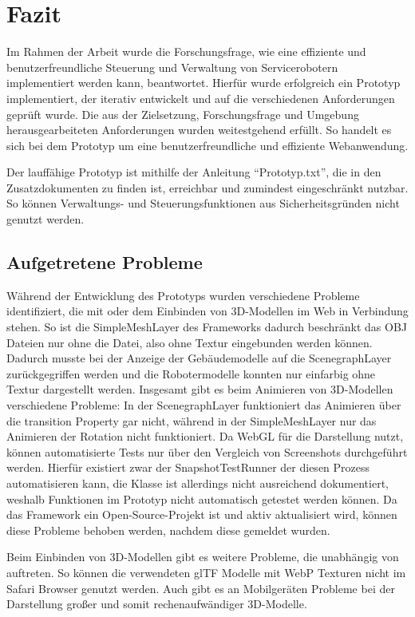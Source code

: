 \newpage
\section{Fazit}
Im Rahmen der Arbeit wurde die Forschungsfrage, wie eine effiziente und benutzerfreundliche Steuerung und Verwaltung von Servicerobotern implementiert werden kann, beantwortet. Hierfür wurde erfolgreich ein Prototyp implementiert, der iterativ entwickelt und auf die verschiedenen Anforderungen geprüft wurde. Die aus der Zielsetzung, Forschungsfrage und Umgebung herausgearbeiteten Anforderungen wurden weitestgehend erfüllt. So handelt es sich bei dem Prototyp um eine benutzerfreundliche und effiziente Webanwendung.

Der lauffähige Prototyp ist mithilfe der Anleitung ``Prototyp.txt'', die in den Zusatzdokumenten zu finden ist, erreichbar und zumindest eingeschränkt nutzbar. So können Verwaltungs- und Steuerungsfunktionen aus Sicherheitsgründen nicht genutzt werden.

\subsection{Aufgetretene Probleme}
Während der Entwicklung des Prototyps wurden verschiedene Probleme identifiziert, die mit \deckgl{} oder dem Einbinden von 3D-Modellen im Web in Verbindung stehen. So ist die SimpleMeshLayer des Frameworks dadurch beschränkt das \ac{OBJ} Dateien nur ohne die \mtl{} Datei, also ohne Textur eingebunden werden können. Dadurch musste bei der Anzeige der Gebäudemodelle auf die ScenegraphLayer zurückgegriffen werden und die Robotermodelle konnten nur einfarbig ohne Textur dargestellt werden. Insgesamt gibt es beim Animieren von 3D-Modellen verschiedene Probleme: In der ScenegraphLayer funktioniert das Animieren über die transition Property gar nicht, während in der SimpleMeshLayer nur das Animieren der Rotation nicht funktioniert. Da \deckgl{} \ac{WebGL} für die Darstellung nutzt, können automatisierte Tests nur über den Vergleich von Screenshots durchgeführt werden. Hierfür existiert zwar der SnapshotTestRunner der diesen Prozess automatisieren kann, die Klasse ist allerdings nicht ausreichend dokumentiert, weshalb \deckgl{} Funktionen im Prototyp nicht automatisch getestet werden können. Da das Framework ein Open-Source-Projekt ist und aktiv aktualisiert wird, können diese Probleme behoben werden, nachdem diese gemeldet wurden.

Beim Einbinden von 3D-Modellen gibt es weitere Probleme, die unabhängig von \deckgl{} auftreten. So können die verwendeten \ac{glTF} Modelle mit \ac{WebP} Texturen nicht im Safari Browser genutzt werden. Auch gibt es an Mobilgeräten Probleme bei der Darstellung großer und somit rechenaufwändiger 3D-Modelle.

